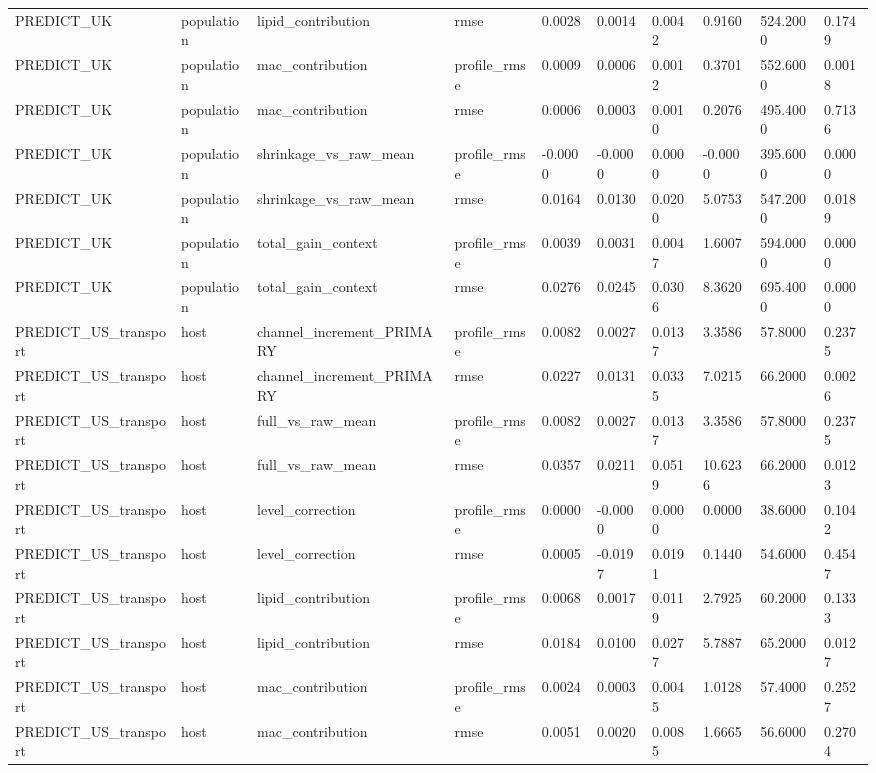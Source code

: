 {\begin{longtable}{llllllllll}
PREDICT\_UK & population & lipid\_contribution & rmse & 0.0028 & 0.0014 & 0.0042 & 0.9160 & 524.2000 & 0.1749 \\
PREDICT\_UK & population & mac\_contribution & profile\_rmse & 0.0009 & 0.0006 & 0.0012 & 0.3701 & 552.6000 & 0.0018 \\
PREDICT\_UK & population & mac\_contribution & rmse & 0.0006 & 0.0003 & 0.0010 & 0.2076 & 495.4000 & 0.7136 \\
PREDICT\_UK & population & shrinkage\_vs\_raw\_mean & profile\_rmse & -0.0000 & -0.0000 & 0.0000 & -0.0000 & 395.6000 & 0.0000 \\
PREDICT\_UK & population & shrinkage\_vs\_raw\_mean & rmse & 0.0164 & 0.0130 & 0.0200 & 5.0753 & 547.2000 & 0.0189 \\
PREDICT\_UK & population & total\_gain\_context & profile\_rmse & 0.0039 & 0.0031 & 0.0047 & 1.6007 & 594.0000 & 0.0000 \\
PREDICT\_UK & population & total\_gain\_context & rmse & 0.0276 & 0.0245 & 0.0306 & 8.3620 & 695.4000 & 0.0000 \\
PREDICT\_US\_transport & host & channel\_increment\_PRIMARY & profile\_rmse & 0.0082 & 0.0027 & 0.0137 & 3.3586 & 57.8000 & 0.2375 \\
PREDICT\_US\_transport & host & channel\_increment\_PRIMARY & rmse & 0.0227 & 0.0131 & 0.0335 & 7.0215 & 66.2000 & 0.0026 \\
PREDICT\_US\_transport & host & full\_vs\_raw\_mean & profile\_rmse & 0.0082 & 0.0027 & 0.0137 & 3.3586 & 57.8000 & 0.2375 \\
PREDICT\_US\_transport & host & full\_vs\_raw\_mean & rmse & 0.0357 & 0.0211 & 0.0519 & 10.6236 & 66.2000 & 0.0123 \\
PREDICT\_US\_transport & host & level\_correction & profile\_rmse & 0.0000 & -0.0000 & 0.0000 & 0.0000 & 38.6000 & 0.1042 \\
PREDICT\_US\_transport & host & level\_correction & rmse & 0.0005 & -0.0197 & 0.0191 & 0.1440 & 54.6000 & 0.4547 \\
PREDICT\_US\_transport & host & lipid\_contribution & profile\_rmse & 0.0068 & 0.0017 & 0.0119 & 2.7925 & 60.2000 & 0.1333 \\
PREDICT\_US\_transport & host & lipid\_contribution & rmse & 0.0184 & 0.0100 & 0.0277 & 5.7887 & 65.2000 & 0.0127 \\
PREDICT\_US\_transport & host & mac\_contribution & profile\_rmse & 0.0024 & 0.0003 & 0.0045 & 1.0128 & 57.4000 & 0.2527 \\
PREDICT\_US\_transport & host & mac\_contribution & rmse & 0.0051 & 0.0020 & 0.0085 & 1.6665 & 56.6000 & 0.2704 \\

\end{longtable}}
